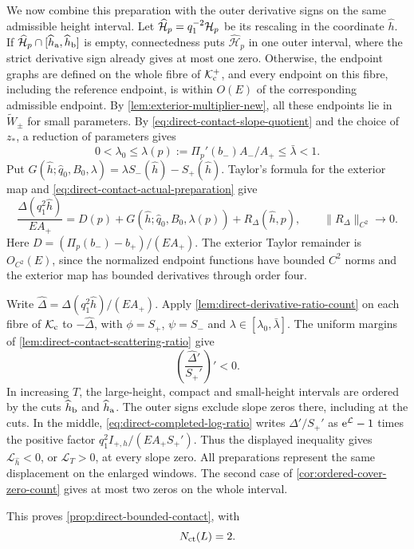 We now combine this preparation with the outer derivative signs on
the same admissible height interval. Let
\(\widehat{\mathcal H}_p=q_1^{-2}\mathcal H_p\) be its rescaling in the
coordinate \(\widehat h\). If \(\widehat{\mathcal H}_p\cap[\widehat h_{\rm a},\widehat h_{\rm b}]\) is empty, connectedness puts
\(\widehat{\mathcal H}_p\) in one outer interval, where the strict derivative sign already
gives at most one zero. Otherwise, the endpoint graphs are defined on
the whole fibre of $\mathcal K_{\rm c}^+$, and every endpoint on this fibre, including
the reference endpoint, is within $O(E)$ of the corresponding
admissible endpoint. By \cref{lem:exterior-multiplier-new}, all these
endpoints lie in \(\widetilde W_\pm\) for small parameters.
By \eqref{eq:direct-contact-slope-quotient} and the choice of \(z_*\),
a reduction of parameters gives
\[
 0<\lambda_0\le\lambda(p):=
 \Pi_p'(b_-)A_-/A_+\le\bar\lambda<1.
\]
Put $G(\widehat h;\widehat q_0,B_0,\lambda)=\lambda S_-(\widehat h)-S_+(\widehat h)$.
Taylor's formula for the exterior map and
\eqref{eq:direct-contact-actual-preparation} give
\begin{equation}
\label{eq:direct-contact-completed-preparation}
 \frac{\Delta(q_1^2\widehat h)}{EA_+}
 =D(p)+G(\widehat h;\widehat q_0,B_0,\lambda(p))+R_\Delta(\widehat h,p),
 \qquad \|R_\Delta\|_{C^2}\to0 .
\end{equation}
Here \(D=(\Pi_p(b_-)-b_+)/(EA_+)\).
The exterior Taylor remainder is
\(O_{C^2}(E)\), since the normalized endpoint functions have
bounded \(C^2\) norms and the exterior map has bounded
derivatives through order four.

Write \(\widehat\Delta=\Delta(q_1^2\widehat h)/(EA_+)\).
Apply \cref{lem:direct-derivative-ratio-count} on each fibre of
\(\mathcal K_{\rm c}\) to \(-\widehat\Delta\), with
\(\phi=S_+\), \(\psi=S_-\) and
\(\lambda\in[\lambda_0,\bar\lambda]\). The uniform margins of
\cref{lem:direct-contact-scattering-ratio} give
\begin{equation}
\label{eq:direct-contact-completed-ratio}
 \left(\frac{\widehat\Delta'}{S_+'}\right)'<0 .
\end{equation}
In increasing \(T\), the large-height, compact and small-height
intervals are ordered by the cuts
\(\widehat h_{\rm b}\) and \(\widehat h_{\rm a}\). The outer signs
exclude slope zeros there, including at the cuts. In the middle,
\eqref{eq:direct-completed-log-ratio} writes
\(\widehat\Delta'/S_+'\) as \(\mathrm e^{\mathcal L}-1\) times the positive
factor \(q_1^2I_{+,h}/(EA_+S_+')\). Thus the displayed inequality gives
\(\mathcal L_{\widehat h}<0\), or \(\mathcal L_T>0\), at every slope
zero. All preparations represent the same displacement on the enlarged
windows. The second case of \cref{cor:ordered-cover-zero-count} gives
at most two zeros on the whole interval.

This proves \cref{prop:direct-bounded-contact}, with
\[
 N_{\rm ct}(L)=2.
\]
